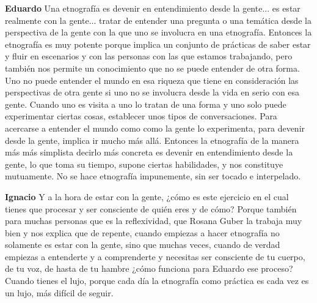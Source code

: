 \documentclass[
  spanish,
  11pt,
  a4paper,
]{scrbook}
\newenvironment{transcripcion}{
    \begin{list}{}{
        \setlength{\leftmargin}{1.5em}  %
        \setlength{\rightmargin}{0em}
        \setlength{\itemsep}{0.2em}     %
        \setlength{\parsep}{0.0em}
        \setlength{\listparindent}{0pt}
    }
}{
    \end{list}
}
\newcommand{\personaje}[1]{\textbf{#1}\quad}
\begin{document}
\begin{transcripcion}
\item \personaje{Eduardo} Una etnografía es devenir en entendimiento desde la gente... es estar realmente con la gente... tratar de entender una pregunta o una temática desde la perspectiva de la gente con la que uno se involucra en una etnografía. Entonces la etnografía es muy potente porque implica un conjunto de prácticas de saber estar y fluir en escenarios y con las personas con las que estamos trabajando, pero también nos permite un conocimiento que no se puede entender de otra forma. Uno no puede entender el mundo en esa riqueza que tiene en consideración las perspectivas de otra gente si uno no se involucra desde la vida en serio con esa gente. Cuando uno es visita a uno lo tratan de una forma y uno solo puede experimentar ciertas cosas, establecer unos tipos de conversaciones. Para acercarse a entender el mundo como como la gente lo experimenta, para devenir desde la gente, implica ir mucho más allá. Entonces la etnografía de la manera más más simplista decirlo más concreta es devenir en entendimiento desde la gente, lo que toma su tiempo, supone ciertas habilidades, y nos constituye mutuamente. No se hace etnografía impunemente, sin ser tocado e interpelado.

\item \personaje{Ignacio} Y a la hora de estar con la gente, ¿cómo es este ejercicio en el cual tienes que procesar y ser consciente de quién eres y de cómo? Porque también para muchas personas que es la reflexividad, que Rosana Guber la trabaja muy bien y nos explica que de repente, cuando empiezas a hacer etnografía no solamente es estar con la gente, sino que muchas veces, cuando de verdad empiezas a entenderte y a comprenderte y necesitas ser consciente de tu cuerpo, de tu voz, de hasta de tu hambre ¿cómo funciona para Eduardo ese proceso? Cuando tienes el lujo, porque cada día la etnografía como práctica es cada vez es un lujo, más difícil de seguir.


\end{transcripcion}
\end{document}
